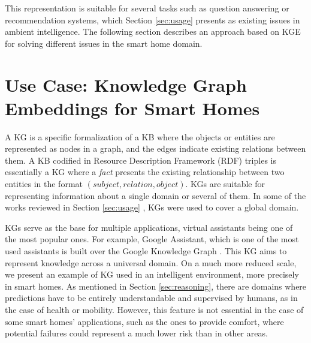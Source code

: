 
This representation is suitable for several tasks such as question answering or recommendation systems, which Section \ref{sec:usage} presents as existing issues in ambient intelligence. The following section describes an approach based on KGE for solving different issues in the smart home domain.



\section{Use Case: Knowledge Graph Embeddings for Smart Homes}
 \label{casestudy} 
A KG is a specific formalization of a KB where the objects or entities are represented as nodes in a graph, and the edges indicate existing relations between them. A KB codified in Resource Description Framework \citep{rdfstandard} (RDF) triples is essentially a KG where a \textit{fact} presents the existing relationship between two entities in the format $(subject, relation, object)$. KGs are suitable for representing information about a single domain or several of them. In some of the works reviewed in Section \ref{sec:usage}  \citep{qiuetal, schoonenbergandfarid}, KGs were used to cover a global domain. 

KGs serve as the base for multiple applications, virtual assistants being one of the most popular ones. For example, Google Assistant, which is one of the most used assistants is built over the Google Knowledge Graph \citep{googlekg}. This KG aims to represent knowledge across a universal domain. On a much more reduced scale, we present an example of KG used in an intelligent environment, more precisely in smart homes. As mentioned in Section \ref{sec:reasoning}, there are domains where predictions have to be entirely understandable and supervised by humans, as in the case of health or mobility. However, this feature is not essential in the case of some smart homes' applications, such as the ones to provide comfort, where potential failures could represent a much lower risk than in other areas. 

